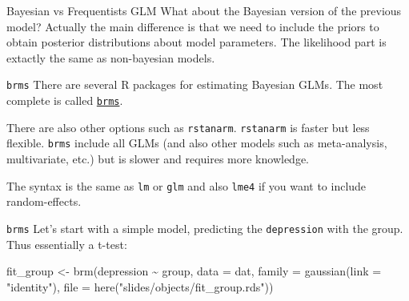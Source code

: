 \documentclass[
  ignorenonframetext,
]{beamer}
\newenvironment{Shaded}{\begin{snugshade}}{\end{snugshade}}
\newcommand{\AttributeTok}[1]{\textcolor[rgb]{0.40,0.45,0.13}{#1}}
\newcommand{\FunctionTok}[1]{\textcolor[rgb]{0.28,0.35,0.67}{#1}}
\newcommand{\NormalTok}[1]{\textcolor[rgb]{0.00,0.23,0.31}{#1}}
\newcommand{\OtherTok}[1]{\textcolor[rgb]{0.00,0.23,0.31}{#1}}
\newcommand{\SpecialCharTok}[1]{\textcolor[rgb]{0.37,0.37,0.37}{#1}}
\newcommand{\StringTok}[1]{\textcolor[rgb]{0.13,0.47,0.30}{#1}}
\begin{document}
\begin{frame}{Bayesian vs Frequentists GLM}
\label{bayesian-vs-frequentists-glm}
What about the Bayesian version of the previous model? Actually the main
difference is that we need to include the priors to obtain posterior
distributions about model parameters. The likelihood part is extactly
the same as non-bayesian models.
\end{frame}

\begin{frame}[fragile]{\texttt{brms}}
\label{brms}
There are several R packages for estimating Bayesian GLMs. The most
complete is called \href{https://paulbuerkner.com/brms/}{\texttt{brms}}.

There are also other options such as \texttt{rstanarm}.
\texttt{rstanarm} is faster but less flexible. \texttt{brms} include all
GLMs (and also other models such as meta-analysis, multivariate, etc.)
but is slower and requires more knowledge.

The syntax is the same as \texttt{lm} or \texttt{glm} and also
\texttt{lme4} if you want to include random-effects.
\end{frame}

\begin{frame}[fragile]{\texttt{brms}}
\label{brms-1}
Let's start with a simple model, predicting the \texttt{depression} with
the group. Thus essentially a t-test:

\begin{Shaded}
\begin{Highlighting}[]
\NormalTok{fit\_group }\OtherTok{\textless{}{-}} \FunctionTok{brm}\NormalTok{(depression }\SpecialCharTok{\textasciitilde{}}\NormalTok{ group, }
                 \AttributeTok{data =}\NormalTok{ dat, }
                 \AttributeTok{family =} \FunctionTok{gaussian}\NormalTok{(}\AttributeTok{link =} \StringTok{"identity"}\NormalTok{), }
                 \AttributeTok{file =} \FunctionTok{here}\NormalTok{(}\StringTok{"slides/objects/fit\_group.rds"}\NormalTok{))}
\end{Highlighting}
\end{Shaded}
\end{frame}
\end{document}
